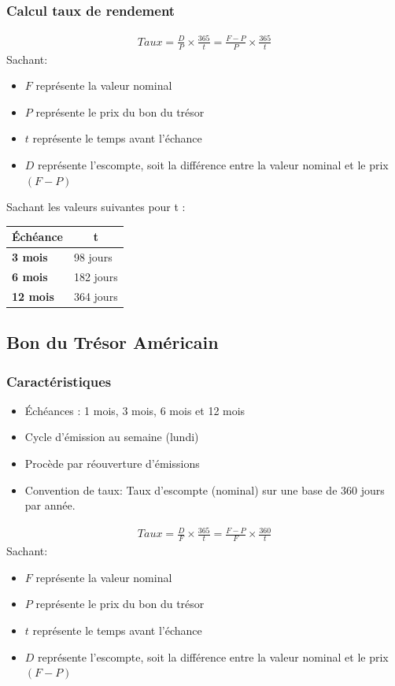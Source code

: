 \documentclass[12pt]{article}
\begin{document}
\subsubsection{Calcul taux de rendement}
\begin{align*}
Taux = \frac{D}{P} \times \frac{365}{t}=\frac{F-P}{P} \times \frac{365}{t}
\end{align*}
Sachant:
\begin{itemize}
\item $F$ représente la valeur nominal 
\item $P$ représente le prix du bon du trésor 
\item $t$ représente le temps avant l'échance 
\item $D$ représente l'escompte, soit la différence entre la valeur nominal et le prix $(F-P)$
\end{itemize}

Sachant les valeurs suivantes pour t :
\begin{table}[H]
\centering
\begin{tabular}{@{}ll@{}}
\toprule
\textbf{Échéance} & \multicolumn{1}{c}{\textbf{t}} \\ \midrule
\textbf{3 mois}   & 98 jours                       \\
\textbf{6 mois}   & 182 jours                      \\
\textbf{12 mois}  & 364 jours                      \\ \bottomrule
\end{tabular}
\end{table}
\newpage
\subsection{Bon du Trésor Américain}
\subsubsection{Caractéristiques}
\begin{itemize}
\item  Échéances : 1 mois, 3 mois,  6 mois et 12 mois
\item Cycle d’émission au semaine (lundi)
\item Procède par réouverture d’émissions
\item Convention de taux: Taux d’escompte (nominal) sur une base de 360 jours par année.
\end{itemize}
\begin{align*}
Taux = \frac{D}{F} \times \frac{365}{t}=\frac{F-P}{F} \times \frac{360}{t}
\end{align*}
Sachant:
\begin{itemize}
\item $F$ représente la valeur nominal 
\item $P$ représente le prix du bon du trésor 
\item $t$ représente le temps avant l'échance 
\item $D$ représente l'escompte, soit la différence entre la valeur nominal et le prix $(F-P)$
\end{itemize}
\end{document}
